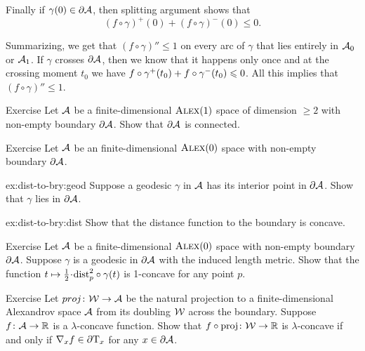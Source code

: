 Finally if $\gamma(0)\in\partial\mathcal{A}$, then splitting argument shows that 
\[(f\circ\gamma)^+(0)+(f\circ\gamma)^-(0)\le 0.\]

Summarizing, we get that $(f\circ\gamma)''\le 1$ on every arc of $\gamma$ that lies entirely in $\mathcal{A}_0$ or $\mathcal{A}_1$.
If $\gamma$ crosses $\partial \mathcal{A}$, then we know that it happens only once and at the crossing moment $t_0$ 
we have $f\circ\gamma^+(t_0)+f\circ\gamma^-(t_0)\leqslant 0$.
All this implies that $(f\circ\gamma)''\le 1$.
\qeds

\begin{thm}{Exercise}\label{ex:bry-connected}
Let $\mathcal{A}$ be a finite-dimensional $\textsc{Alex}(1)$ space of dimension $\ge 2$ with non-empty boundary $\partial\mathcal{A}$.
Show that $\partial\mathcal{A}$ is connected.
\end{thm}



\begin{thm}{Exercise}\label{ex:dist-to-bry}
Let $\mathcal{A}$ be an finite-dimensional $\textsc{Alex}(0)$ space with non-empty boundary $\partial\mathcal{A}$.

\begin{subthm}{ex:dist-to-bry:geod}
Suppose a geodesic $\gamma$ in $\mathcal{A}$ has its interior point in $\partial\mathcal{A}$.
Show that $\gamma$ lies in $\partial\mathcal{A}$.
\end{subthm}


\begin{subthm}{ex:dist-to-bry:dist}
Show that the distance function to the boundary is concave.
\end{subthm}

\end{thm}

\begin{thm}{Exercise}\label{ex:liberman}
Let $\mathcal{A}$ be a finite-dimensional $\textsc{Alex}(0)$ space with non-empty boundary $\partial\mathcal{A}$.
Suppose $\gamma$ is a geodesic in $\partial\mathcal{A}$ with the induced length metric.
Show that the function $t\mapsto \tfrac12\cdot\distfun_p^2\circ\gamma(t)$ is 1-concave for any point $p$. 
\end{thm}

\begin{thm}{Exercise}\label{ex:native}
Let $proj\colon\mathcal{W}\to\mathcal{A}$ be the natural projection to a finite-dimensional Alexandrov space $\mathcal{A}$ from its doubling $\mathcal{W}$ across the boundary.
Suppose $f\colon\mathcal{A}\to\mathbb{R}$ is a $\lambda$-concave function.
Show that $f\circ\operatorname{\rm proj}\nolimits\colon\mathcal{W}\to\mathbb{R}$ is $\lambda$-concave if and only if $\nabla_xf\in \partial \mathrm{T}_x$ 
for any $x\in\partial \mathcal{A}$.
\end{thm}



